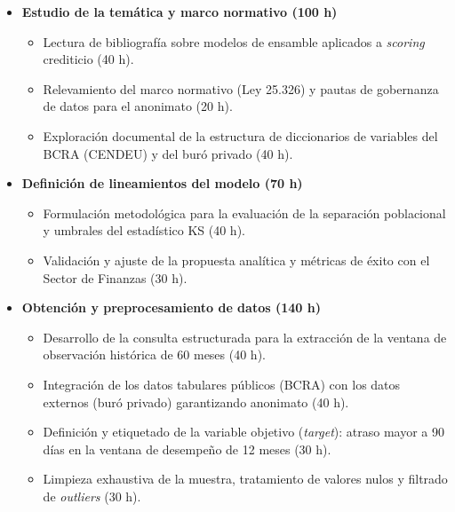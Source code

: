 \documentclass[
11pt, %
]{charter}
\begin{document}
\begin{itemize}

    \item \textbf{Estudio de la temática y marco normativo (100 h)}
    \begin{itemize}
        \item Lectura de bibliografía sobre modelos de ensamble aplicados a \textit{scoring} crediticio (40 h).
        \item Relevamiento del marco normativo (Ley 25.326) y pautas de gobernanza de datos para el anonimato (20 h).
        \item Exploración documental de la estructura de diccionarios de variables del BCRA (CENDEU) y del buró privado (40 h).
    \end{itemize}

    \item \textbf{Definición de lineamientos del modelo (70 h)}
    \begin{itemize}
        \item Formulación metodológica para la evaluación de la separación poblacional y umbrales del estadístico KS (40 h).
        \item Validación y ajuste de la propuesta analítica y métricas de éxito con el Sector de Finanzas (30 h).
    \end{itemize}

    \item \textbf{Obtención y preprocesamiento de datos (140 h)}
    \begin{itemize}
        \item Desarrollo de la consulta estructurada para la extracción de la ventana de observación histórica de 60 meses (40 h).
        \item Integración de los datos tabulares públicos (BCRA) con los datos externos (buró privado) garantizando anonimato (40 h).
        \item Definición y etiquetado de la variable objetivo (\textit{target}): atraso mayor a 90 días en la ventana de desempeño de 12 meses (30 h).
        \item Limpieza exhaustiva de la muestra, tratamiento de valores nulos y filtrado de \textit{outliers} (30 h).
    \end{itemize}


\end{itemize}
\end{document}
